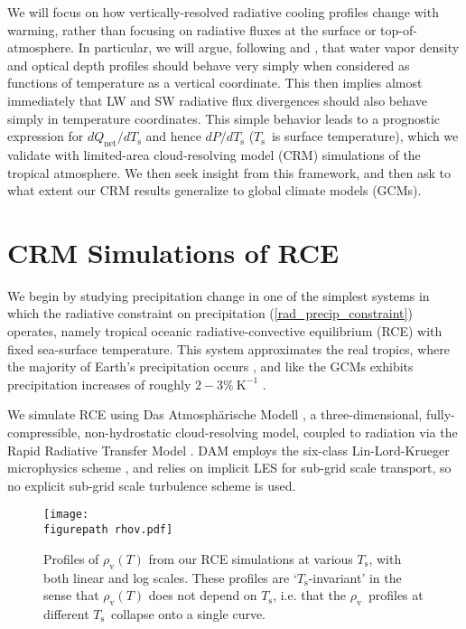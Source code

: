 \documentclass[10pt]{article}
\newcommand{\eqnref}[1]{(\ref{#1})}
\newcommand{\Qnet}{\ensuremath{Q_\mathrm{net}}}
\newcommand{\rhov}{\ensuremath{\rho_\mathrm{v}}}
\newcommand{\Ts}{\ensuremath{T_\mathrm{s}}}
\newcommand{\Kinverse}{\ensuremath{\mathrm{K^{-1}}}}
\newcommand{\figurepath}{../figures/}
\begin{document}
We will  focus on how vertically-resolved radiative cooling profiles change with warming, rather than focusing on radiative fluxes at the surface or top-of-atmosphere. In particular, we will argue, following \cite{simpson1928} and \cite{ingram2010}, that water vapor density and optical depth profiles should behave very simply when considered as functions of temperature as a vertical coordinate. This then implies almost immediately that LW and SW radiative flux divergences should also behave simply in temperature coordinates. This simple behavior leads to a prognostic expression for $d\Qnet/d\Ts$ and hence $dP/d\Ts$ (\Ts\ is surface temperature), which we validate with limited-area cloud-resolving model (CRM) simulations of the tropical atmosphere. We then seek insight from this framework, and then ask to what extent our CRM results generalize to global climate models (GCMs).


\section{CRM Simulations of RCE}
We begin by studying precipitation change in one of the simplest systems in which the radiative constraint on precipitation \eqnref{rad_precip_constraint} operates, namely tropical oceanic radiative-convective equilibrium (RCE) with fixed sea-surface temperature. This system approximates the real tropics, where the majority of Earth's precipitation occurs \citep{simpson1988}, and like the GCMs exhibits precipitation increases of roughly $2 -3\%\ \Kinverse$ \citep{romps2011, muller2011b}.  

We simulate RCE using Das Atmosph\"arische Modell \citep[DAM,][]{romps2008},   a three-dimensional, fully-compressible, non-hydrostatic cloud-resolving model, coupled to radiation via the Rapid Radiative Transfer Model 
\citep[RRTM,][]{mlawer1997}. DAM employs the six-class Lin-Lord-Krueger  microphysics scheme \citep{lin1983, lord1984, krueger1995}, and relies on implicit LES \citep{margolin2006} for sub-grid scale transport, so no explicit sub-grid scale turbulence scheme is used.

\begin{figure}[t]
	\begin{center}
			\texttt{[image: \\figurepath rhov.pdf]}
		\caption{Profiles of $\rhov(T)$ from our RCE simulations at various \Ts, with both linear and log scales. These profiles are `\Ts-invariant' in the sense that $\rhov(T)$ does not depend on \Ts, i.e. that the \rhov\ profiles at different \Ts\ collapse onto a single curve.
		\label{rhov_fig}
		}
	\end{center}
\end{figure}
\end{document}
